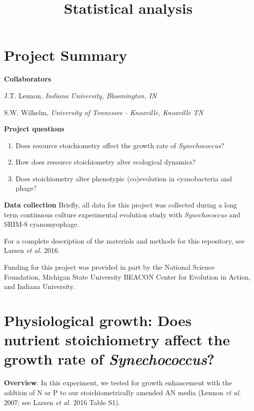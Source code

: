 \documentclass[]{article}
\title{Statistical analysis}
\author{}
\date{}
\providecommand{\tightlist}{%
  \setlength{\itemsep}{0pt}\setlength{\parskip}{0pt}}
\begin{document}
\maketitle

\section{Project Summary}\label{project-summary}

\textbf{Collaborators}

J.T. Lennon, \emph{Indiana University, Bloomington, IN}

S.W. Wilhelm, \emph{University of Tennessee - Knoxville, Knoxville TN}

\textbf{Project questions}

\begin{enumerate}
\def\labelenumi{\arabic{enumi}.}
\tightlist
\item
  Does resource stoichiometry affect the growth rate of
  \emph{Synechococcus}?
\item
  How does resource stoichiometry alter ecological dynamics?
\item
  Does stoichiometry alter phenotypic (co)evolution in cyanobacteria and
  phage?
\end{enumerate}

\textbf{Data collection} Briefly, all data for this project was
collected during a long term continuous culture experimental evolution
study with \emph{Synechococcus} and SRIM-8 cyanomyophage.

For a complete description of the materials and methods for this
repository, see Larsen \emph{et al.} 2016.

Funding for this project was provided in part by the National Science
Foundation, Michigan State University BEACON Center for Evolution in
Action, and Indiana University.

\newpage

\tableofcontents
\newpage

\section{\texorpdfstring{Physiological growth: Does nutrient
stoichiometry affect the growth rate of
\emph{Synechococcus}?}{Physiological growth: Does nutrient stoichiometry affect the growth rate of Synechococcus?}}\label{physiological-growth-does-nutrient-stoichiometry-affect-the-growth-rate-of-synechococcus}

\textbf{Overview}: In this experiment, we tested for growth enhancement
with the addtion of N or P to our stoichiometrically amended AN media
(Lennon \emph{et al.} 2007; see Larsen \emph{et al.} 2016 Table S1).
\end{document}
